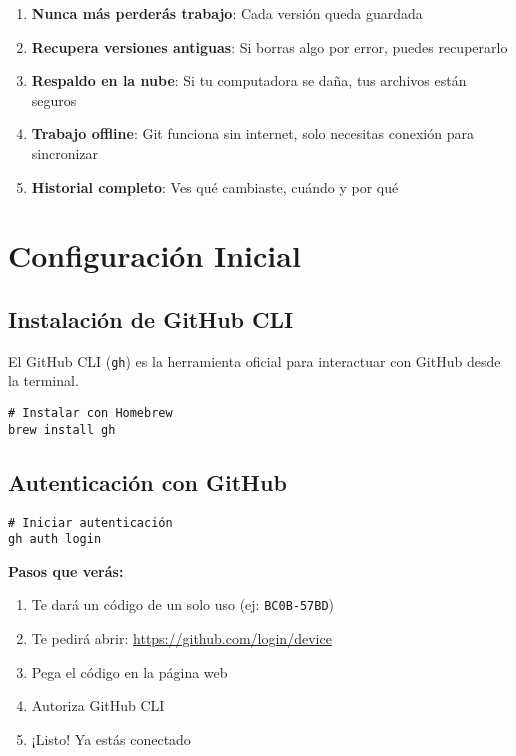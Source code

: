\documentclass[11pt,a4paper]{article}
\begin{document}
\begin{successbox}
\begin{enumerate}
  \item \textbf{Nunca más perderás trabajo}: Cada versión queda guardada
  \item \textbf{Recupera versiones antiguas}: Si borras algo por error, puedes recuperarlo
  \item \textbf{Respaldo en la nube}: Si tu computadora se daña, tus archivos están seguros
  \item \textbf{Trabajo offline}: Git funciona sin internet, solo necesitas conexión para sincronizar
  \item \textbf{Historial completo}: Ves qué cambiaste, cuándo y por qué
\end{enumerate}
\end{successbox}

\section{Configuración Inicial}

\subsection{Instalación de GitHub CLI}

El GitHub CLI (\texttt{gh}) es la herramienta oficial para interactuar con GitHub desde la terminal.

\begin{lstlisting}[style=bashstyle]
# Instalar con Homebrew
brew install gh
\end{lstlisting}

\subsection{Autenticación con GitHub}

\begin{lstlisting}[style=bashstyle]
# Iniciar autenticación
gh auth login
\end{lstlisting}

\textbf{Pasos que verás:}
\begin{enumerate}
  \item Te dará un código de un solo uso (ej: \texttt{BC0B-57BD})
  \item Te pedirá abrir: \url{https://github.com/login/device}
  \item Pega el código en la página web
  \item Autoriza GitHub CLI
  \item ¡Listo! Ya estás conectado
\end{enumerate}
\end{document}
